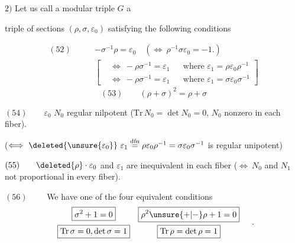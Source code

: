 $2)$ Let us call a modular triple  $G$ a


triple of sections $(\rho,\sigma,\varepsilon_0)$ satisfying the
 following conditions

\[
\begin{aligned}
(52)\qquad &-\sigma^{-1}\rho=\varepsilon_0
\quad(\Longleftrightarrow\ \rho^{-1}\sigma\varepsilon_0=-1.)\\
&\left[\begin{aligned}
&\Longleftrightarrow\ -\rho\sigma^{-1}=\varepsilon_1
&&\text{where }\varepsilon_1=\rho\varepsilon_0\rho^{-1}\\
&\Longleftrightarrow\ -\rho\sigma^{-1}=\varepsilon_1
&&\text{where }\varepsilon_1=\sigma\varepsilon_0\sigma^{-1}
\end{aligned}\right]
\end{aligned}
\]
\[
(53)\qquad(\rho+\sigma)^2=\rho+\sigma
\]

$(54)\qquad\varepsilon_0$
$N_0$  regular nilpotent
($\mathrm{Tr}\,N_0=\det N_0=0$, $N_0$ nonzero in each fiber).


($\Longleftrightarrow\ \deleted{\unsure{\varepsilon_0}}\ \varepsilon_1
\overset{\mathrm{dfn}}=\rho\varepsilon_0\rho^{-1}
=\sigma\varepsilon_0\sigma^{-1}$ is regular unipotent)

$(55)\qquad\deleted{\rho}\cdot\varepsilon_0$ and $\varepsilon_1$ are
inequivalent in each fiber
($\Longleftrightarrow\ N_0$ and $N_1$ not proportional in every fiber).

$(56)\qquad$ We have one of the four equivalent conditions
\[
\begin{array}{cc}
\boxed{\sigma^2+1=0}&\boxed{\rho^2\unsure{+|-}\rho+1=0}\\[6pt]
\boxed{\mathrm{Tr}\,\sigma=0,\det\sigma=1}&
\boxed{\mathrm{Tr}\,\rho=\det\rho=1}
\end{array}
\quad.
\]

